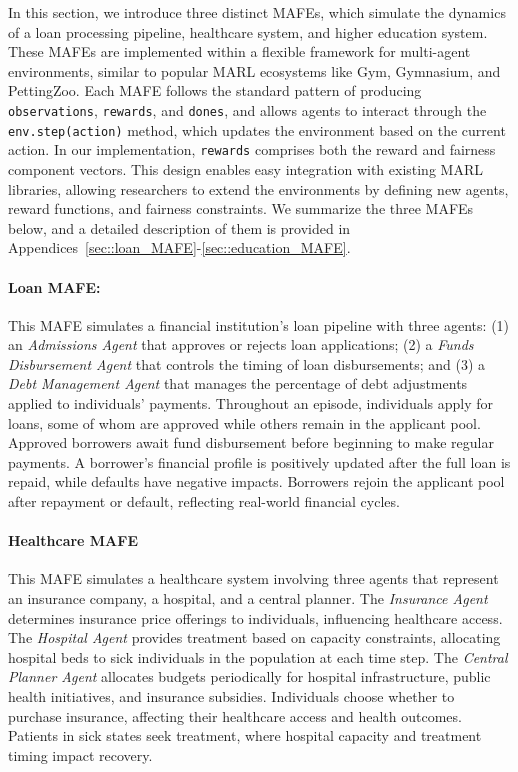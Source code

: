 \label{env}

In this section, we introduce three distinct MAFEs, which simulate the dynamics of a loan processing pipeline, healthcare system, and higher education system. These MAFEs are implemented within a flexible framework for multi-agent environments, similar to popular MARL ecosystems like Gym, Gymnasium, and PettingZoo. Each MAFE follows the standard pattern of producing \texttt{observations}, \texttt{rewards}, and \texttt{dones}, and allows agents to interact through the \texttt{env.step(action)} method, which updates the environment based on the current action. In our implementation, \texttt{rewards} comprises both the reward and fairness component vectors. This design enables easy integration with existing MARL libraries, allowing researchers to extend the environments by defining new agents, reward functions, and fairness constraints. We summarize the three MAFEs below, and a detailed description of them is provided in Appendices~\ref{sec::loan_MAFE}-\ref{sec::education_MAFE}.

\paragraph{Loan MAFE:}
This MAFE simulates a financial institution's loan pipeline with three agents: (1) an \textit{Admissions Agent} that approves or rejects loan applications; (2) a \textit{Funds Disbursement Agent} that controls the timing of loan disbursements; and (3) a \textit{Debt Management Agent} that manages the percentage of debt adjustments applied to individuals' payments. Throughout an episode, individuals apply for loans, some of whom are approved while others remain in the applicant pool. Approved borrowers await fund disbursement before beginning to make regular payments. A borrower’s financial profile is positively updated after the full loan is repaid, while defaults have negative impacts. Borrowers rejoin the applicant pool after repayment or default, reflecting real-world financial cycles.
\vspace{-3mm}
\paragraph{Healthcare MAFE} 
This MAFE simulates a healthcare system involving three agents that represent an insurance company, a hospital, and a central planner. The \textit{Insurance Agent} determines insurance price offerings to individuals, influencing healthcare access. The \textit{Hospital Agent} provides treatment based on capacity constraints, allocating hospital beds to sick individuals in the population at each time step. The \textit{Central Planner Agent} allocates budgets periodically for hospital infrastructure, public health initiatives, and insurance subsidies. Individuals choose whether to purchase insurance, affecting their healthcare access and health outcomes. Patients in sick states seek treatment, where hospital capacity and treatment timing impact recovery.
\vspace{-3mm}
